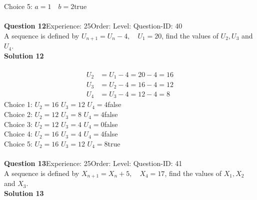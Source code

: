 \documentclass{article}
\begin{document}
Choice 5: \hspace{20pt}$a=1 \quad b=2$\hspace{20pt}true\\
\\[4pt]
\noindent\textbf{Question 12}\hspace{20pt}Experience: 25\hspace{20pt}Order: \hspace{20pt}Level: \hspace{20pt}Question-ID: 40\\[2pt]
A sequence is defined by $U_{n+1}=U_n-4, \quad U_1=20$, find the values of $U_2,U_3$ and $U_4$.\\[4pt]
\noindent\textbf{Solution 12}\\[2pt]
\\[-35pt]\begin{align*}
U_2&=U_1-4=20-4=16\\[2pt]
U_3&=U_2-4=16-4=12\\[2pt]
U_4&=U_3-4=12-4=8
\end{align*}
Choice 1: \hspace{20pt}$U_2=16 \,\, U_3=12 \,\, U_4=4$\hspace{20pt}false\\
Choice 2: \hspace{20pt}$U_2=12 \,\, U_3=8 \,\, U_4=4$\hspace{20pt}false\\
Choice 3: \hspace{20pt}$U_2=12 \,\, U_3=4 \,\, U_4=0$\hspace{20pt}false\\
Choice 4: \hspace{20pt}$U_2=16 \,\, U_3=4 \,\, U_4=4$\hspace{20pt}false\\
Choice 5: \hspace{20pt}$U_2=16 \,\, U_3=12 \,\, U_4=8$\hspace{20pt}true\\
\\[4pt]
\noindent\textbf{Question 13}\hspace{20pt}Experience: 25\hspace{20pt}Order: \hspace{20pt}Level: \hspace{20pt}Question-ID: 41\\[2pt]
A sequence is defined by $X_{n+1}=X_n+5, \quad X_4=17$, find the values of $X_1,X_2$ and $X_3$.\\[4pt]
\noindent\textbf{Solution 13}\\[2pt]
\end{document}
